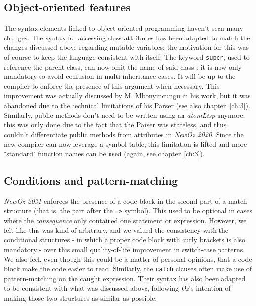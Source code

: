 \subsection{Object-oriented features}
The syntax elements linked to object-oriented programming haven't seen many changes.
The syntax for accessing class attributes has been adapted to match the changes discussed above regarding mutable variables;
the motivation for this was of course to keep the language consistent with itself.
The keyword \texttt{super}, used to reference the parent class, can now omit the name of said class : it is now only mandatory to avoid confusion in multi-inheritance cases.
It will be up to the compiler to enforce the presence of this argument when necessary.
This improvement was actually discussed by M. Mbonyincungu in his work, but it was abandoned due to the technical limitations of his Parser (see also chapter~\ref{ch:3}).\newline
Similarly, public methods don't need to be written using an \textit{atomLisp} anymore;
this was only done due to the fact that the Parser was stateless, and thus couldn't differentiate public methods from attributes in \textit{NewOz 2020}.
Since the new compiler can now leverage a symbol table, this limitation is lifted and more "standard" function names can be used (again, see chapter~\ref{ch:3}).\newline

\subsection{Conditions and pattern-matching}
\textit{NewOz 2021} enforces the presence of a code block in the second part of a match structure (that is, the part after the \texttt{=>} symbol).
This used to be optional in cases where the \textit{consequence} only contained one statement or expression.
However, we felt like this was kind of arbitrary, and we valued the consistency with the conditional structures - in which a proper code block with curly brackets is also mandatory - over this small quality-of-life improvement in switch-case patterns.
We also feel, even though this could be a matter of personal opinions, that a code block make the code easier to read.\newline
Similarly, the \texttt{catch} clauses often make use of pattern-matching on the caught expression.
Their syntax has also been adapted to be consistent with what was discussed above, following \textit{Oz}'s intention of making those two structures as similar as possible.\newline

